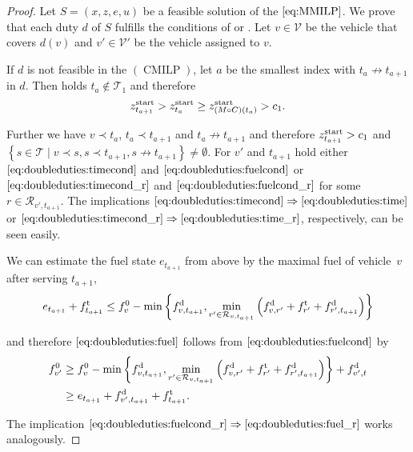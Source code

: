 \begin{proof}

Let $S=\left(x,z,e,u\right)$ be a feasible solution of the $\eqref{eq:MMILP}$. We prove that each duty $d$ of $S$ fulfills the conditions of  or . Let ${v\in\mathcal{V}}$ be the vehicle that covers $d(v)$ and ${v'\in\mathcal{V}'}$ be the vehicle assigned to $v$.

If $d$ is not feasible in the $(\operatorname{CMILP})$, let $a$ be the smallest index with ${t_a\not\to t_{a+1}}$ in $d$. Then holds ${t_a\not\in\mathcal{T}_1}$ and therefore
\begin{align*}
	 z^{\operatorname{start}}_{t_{a+1}} > z^{\operatorname{start}}_{t_a} \geq z^{\operatorname{start}}_{\left(M\circ C\right)\left(t_a\right)} > c_1.
\end{align*}

Further we have $v\prec t_a$, $t_a\prec t_{a+1}$ and $t_a\not\to t_{a+1}$ and therefore ${z^{\operatorname{start}}_{t_{a+1}}>c_1}$ and ${\left\{s\in\mathcal{T}\mid v\prec s, s\prec t_{a+1}, s\not\to t_{a+1}\right\}\neq\emptyset}$. For $v'$ and $t_{a+1}$ hold either $\eqref{eq:doubleduties:timecond}$ and $\eqref{eq:doubleduties:fuelcond}$ or $\eqref{eq:doubleduties:timecond_r}$ and $\eqref{eq:doubleduties:fuelcond_r}$ for some ${r\in\mathcal{R}_{v',t_{a+1}}}$. The implications ${\eqref{eq:doubleduties:timecond}\Rightarrow\eqref{eq:doubleduties:time}}$ or\linebreak
${\eqref{eq:doubleduties:timecond_r}\Rightarrow\eqref{eq:doubleduties:time_r}}$, respectively, can be seen easily.

We can estimate the fuel state $e_{t_{a+1}}$ from above by the maximal fuel of vehicle~$v$ after serving $t_{a+1}$, \ie
\begin{align*}
	e_{t_{a+1}} + f^{\operatorname{t}}_{t_{a+1}} \leq f^0_v - \min\left\{f^{\operatorname{d}}_{v,t_{a+1}}, \min_{r'\in\mathcal{R}_{v,t_{a+1}}}\left(f^{\operatorname{d}}_{v,r'}+f^{\operatorname{t}}_{r'}+f^{\operatorname{d}}_{r',t_{a+1}}\right)\right\}
\end{align*}

and therefore $\eqref{eq:doubleduties:fuel}$ follows from $\eqref{eq:doubleduties:fuelcond}$ by
\begin{align*}
	f^0_{v'} & \geq f^0_v - \min\left\{f^{\operatorname{d}}_{v,t_{a+1}}, \min_{r'\in\mathcal{R}_{v,t_{a+1}}}\left(f^{\operatorname{d}}_{v,r'}+f^{\operatorname{t}}_{r'}+f^{\operatorname{d}}_{r',t_{a+1}}\right)\right\} + f^{\operatorname{d}}_{v',t} \\
	& \geq e_{t_{a+1}} + f^{\operatorname{d}}_{v',t_{a+1}} + f^{\operatorname{t}}_{t_{a+1}}.
\end{align*}

The implication ${\eqref{eq:doubleduties:fuelcond_r}\Rightarrow\eqref{eq:doubleduties:fuel_r}}$ works analogously.


\end{proof}
